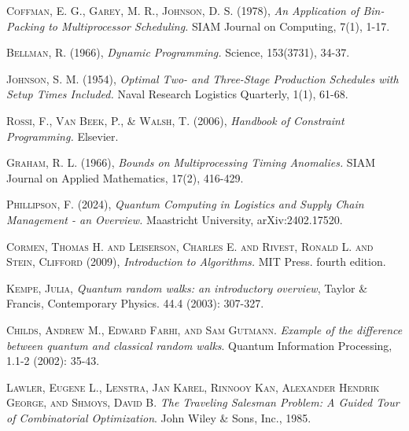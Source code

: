 \documentclass[11pt,a4paper,spanish]{book}
\begin{document}
\begin{thebibliography}{a}
	 \textsc{Coffman, E. G., Garey, M. R., Johnson, D. S.} (1978),
	\textit{An Application of Bin-Packing to Multiprocessor Scheduling.}
	SIAM Journal on Computing, 7(1), 1-17.
	
	 \textsc{Bellman, R.} (1966),
	\textit{Dynamic Programming.}
	Science, 153(3731), 34-37.
	
	 \textsc{Johnson, S. M.} (1954),
	\textit{Optimal Two- and Three-Stage Production Schedules with Setup Times Included.}
	Naval Research Logistics Quarterly, 1(1), 61-68.
	
	 \textsc{Rossi, F., Van Beek, P., \& Walsh, T.} (2006),
	\textit{Handbook of Constraint Programming.}
	Elsevier.
	
	 \textsc{Graham, R. L.} (1966),
	\textit{Bounds on Multiprocessing Timing Anomalies.}
	SIAM Journal on Applied Mathematics, 17(2), 416-429.
	
	 \textsc{Phillipson, F.} (2024),
	\textit{Quantum Computing in Logistics and Supply Chain Management - an Overview.}
	Maastricht University, arXiv:2402.17520.

    \textsc{Cormen, Thomas H. and Leiserson, Charles E. and Rivest, Ronald L. and Stein, Clifford} (2009),
	\textit{Introduction to Algorithms.}
	MIT Press. fourth edition.

    \textsc{Kempe, Julia},
    \textit{Quantum random walks: an introductory overview},
    Taylor \& Francis, Contemporary Physics. 44.4 (2003): 307-327.

    \textsc{Childs, Andrew M., Edward Farhi, and Sam Gutmann.}
    \textit{Example of the difference between quantum and classical random walks}.
    Quantum Information Processing, 1.1-2 (2002): 35-43.    

    \textsc{Lawler, Eugene L., Lenstra, Jan Karel, Rinnooy Kan, Alexander Hendrik George, and Shmoys, David B.}
    \textit{The Traveling Salesman Problem: A Guided Tour of Combinatorial Optimization}. 
    John Wiley \& Sons, Inc., 1985.

\end{thebibliography}

\appendix
\end{document}
